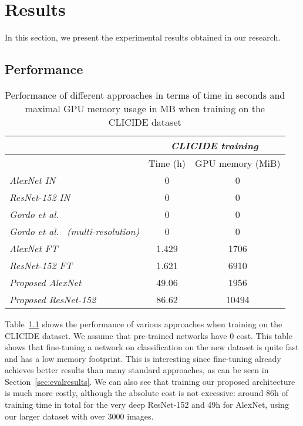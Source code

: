 
\chapter{Results}
In this section, we present the experimental results obtained in our
research.

\section{Performance}\label{sec:perfresults}

\begin{table}
\begin{tabular}{|l|c|c|}
\hline & \multicolumn{2}{c|}{\emph{CLICIDE training}}\\
\hline & Time (h) & GPU memory (MiB)\\
\hline \emph{AlexNet IN} & 0 & 0\\
\hline \emph{ResNet-152 IN} & 0 & 0\\
\hline \emph{Gordo et al.~\cite{gordo_deep_2016}} & 0 & 0\\
\hline \emph{Gordo et al.~\cite{gordo_deep_2016} (multi-resolution)}
& 0 & 0\\
\hline \emph{AlexNet FT} & 1.429 & 1706\\
\hline \emph{ResNet-152 FT} & 1.621 & 6910\\
\hline \emph{Proposed AlexNet} & 49.06 & 1956\\
\hline \emph{Proposed ResNet-152} & 86.62 & 10494\\
\hline
\end{tabular}
\caption{Performance of different approaches in terms of time in seconds and
maximal GPU memory usage in MB when training on the CLICIDE dataset
\label{tab:perftrain}}
\end{table}

Table~\ref{tab:perftrain} shows the performance of various approaches
when training on the CLICIDE dataset. We assume that pre-trained
networks have 0 cost. This table shows that fine-tuning a network
on classification on the new dataset is quite fast and has a low memory
footprint. This is interesting since fine-tuning already achieves better
results than many standard approaches, as can be seen in
Section~\ref{sec:evalresults}.
We can also see that training our proposed architecture is much
more costly, although the absolute cost is not excessive:
around 86h of training time in total for the very deep ResNet-152
and 49h for AlexNet, using our larger dataset with over 3000 images.

